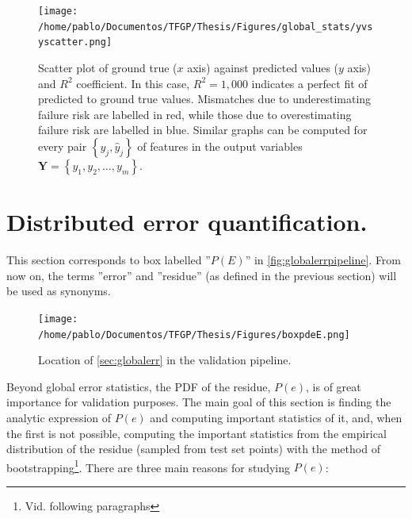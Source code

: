 %
\begin{figure}
	\centering
	\texttt{[image: /home/pablo/Documentos/TFGP/Thesis/Figures/global\_stats/yvsyscatter.png]}
	\caption{Scatter plot of ground true ($x$ axis) against predicted values ($y$ axis) and $R^2$ coefficient. In this case, $R^2=1,000$ indicates a perfect fit of predicted to ground true values. Mismatches due to underestimating failure risk are labelled in red, while those due to overestimating failure risk are labelled in blue. Similar graphs can be computed for every pair $\left\{y_j,\hat{y}_j\right\}$ of features in the output variables $\mathbf{Y}=\left\{y_1,y_2,\ldots,y_m\right\}$.}
	\label{fig:truevspredscatter}
\end{figure}
%
\clearpage
\section{Distributed error quantification.}\label{sec:disterr}
\noindent This section corresponds to box labelled ''$P(E)$'' in \autoref{fig:globalerrpipeline}. From now on, the terms ''error'' and ''residue'' (as defined in the previous section) will be used as synonyms.\\
\begin{figure}[!htb]
	\centering
	\texttt{[image: /home/pablo/Documentos/TFGP/Thesis/Figures/boxpdeE.png]}
	\caption{Location of \autoref{sec:globalerr} in the validation pipeline.}
	\label{fig:globalerrpipeline}
\end{figure}
%
\indent Beyond global error statistics, the PDF of the residue, $P(e)$, is of great importance for validation purposes. The main goal of this section is finding the analytic expression of $P(e)$ and computing important statistics of it, and, when the first is not possible, computing the important statistics from the empirical distribution of the residue (sampled from test set points) with the method of bootstrapping\footnote{Vid. following paragraphs}. There are three main reasons for studying $P(e)$:\\
